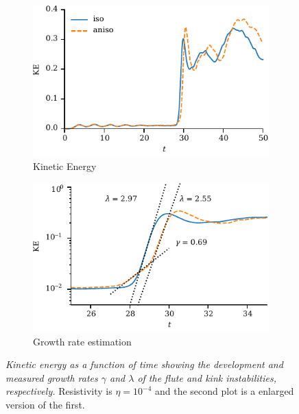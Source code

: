 \documentclass[fleqn,usenatbib]{mnras}
\newcommand{\mycaption}[2]{\caption[#1]{\emph{#1} #2}}
\begin{document}
\begin{figure}
  \centering
    \begin{subfigure}{0.49\textwidth}
      \includegraphics[width=\linewidth]{kinetic_energy-4.pdf}
      \caption{Kinetic Energy}
      \label{fig:kink_ke-4}
    \end{subfigure}
    \hfill
    \begin{subfigure}{0.49\textwidth}
      \includegraphics[width=\linewidth]{kinetic_energy_log-4.pdf}
      \caption{Growth rate estimation}
      \label{fig:kink_ke_log-4}
    \end{subfigure}
  \mycaption{Kinetic energy as a function of time showing the development and
  measured growth rates $\gamma$ and $\lambda$ of the flute and kink
  instabilities, respectively.}{Resistivity is $\eta=10^{-4}$ and the second
  plot is a enlarged version of the first.}
\label{fig:kink_str8_ke-4}%
\end{figure}
\end{document}
